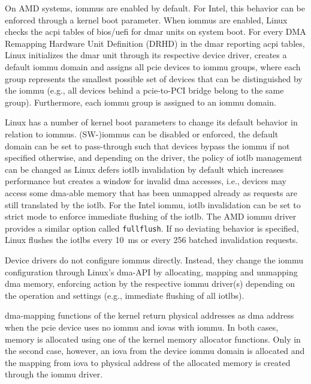 On AMD systems, \acp{iommu} are enabled by default. For Intel, this behavior can
be enforced through a kernel boot parameter. When \acp{iommu} are enabled, Linux
checks the \acs{acpi} tables of \ac{bios}/\ac{uefi} for \ac{dmar} units on
system boot. For every DMA Remapping Hardware Unit Definition (DRHD) in the
\ac{dmar} reporting \ac{acpi} tables, Linux initializes the \ac{dmar} unit
through its respective device driver, creates a default \ac{iommu} domain and
assigns all \ac{pcie} devices to \ac{iommu} groups, where each group represents
the smallest possible set of devices that can be distinguished by the \ac{iommu}
(e.g., all devices behind a \ac{pcie}-to-PCI bridge belong to the same group).
Furthermore, each \ac{iommu} group is assigned to an \ac{iommu} domain.

Linux has a number of kernel boot parameters to change its default behavior in
relation to \acp{iommu}. (SW-)\acp{iommu} can be disabled or enforced, the
default domain can be set to pass-through such that devices bypass the
\ac{iommu} if not specified otherwise, and depending on the driver, the policy
of \ac{iotlb} management can be changed as Linux defers \ac{iotlb} invalidation
by default which increases performance but creates a window for invalid \ac{dma}
accesses, i.e., devices may access some \ac{dma}-able memory that has been
unmapped already as requests are still translated by the \ac{iotlb}. For the
Intel \ac{iommu}, \ac{iotlb} invalidation can be set to strict mode to enforce
immediate flushing of the \ac{iotlb}. The AMD \ac{iommu} driver provides a
similar option called \texttt{fullflush}. If no deviating behavior is specified,
Linux flushes the \acp{iotlb} every \SI{10}{\ms} or every 256 batched
invalidation requests.

Device drivers do not configure \acp{iommu} directly. Instead, they change the
\ac{iommu} configuration through Linux's \ac{dma}-API by allocating, mapping and
unmapping \ac{dma} memory, enforcing action by the respective \ac{iommu}
driver(s) depending on the operation and settings (e.g., immediate flushing of
all \acp{iotlb}).

\ac{dma}-mapping functions of the kernel return physical addresses as \ac{dma}
address when the \ac{pcie} device uses no \ac{iommu} and \acp{iova} with
\ac{iommu}. In both cases, memory is allocated using one of the kernel memory
allocator functions. Only in the second case, however, an \ac{iova} from the
device \ac{iommu} domain is allocated and the mapping from \ac{iova} to physical
address of the allocated memory is created through the \ac{iommu} driver.

